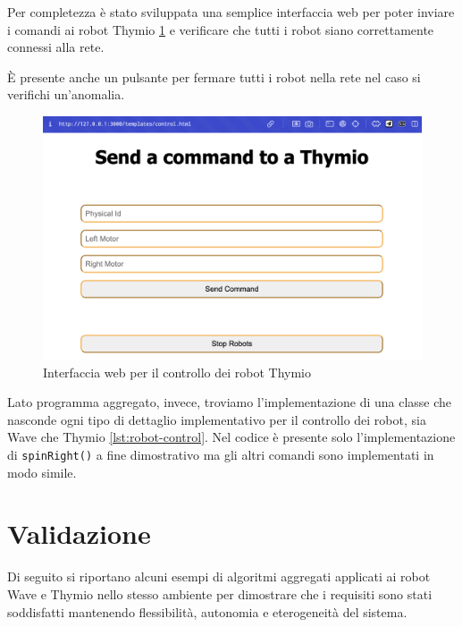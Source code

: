 \documentclass[12pt,a4paper,openright,twoside]{book}
\begin{document}




Per completezza è stato sviluppata una semplice interfaccia web per poter inviare i comandi ai robot Thymio \cref{fig:web-interface} e verificare che tutti i robot siano correttamente connessi alla rete.

È presente anche un pulsante per fermare tutti i robot nella rete nel caso si verifichi un'anomalia.

\begin{figure}
    \centering
    \includegraphics[width=.8\linewidth]{figures/web-interface.png}
    \caption{Interfaccia web per il controllo dei robot Thymio}
    \label{fig:web-interface}
\end{figure}

Lato programma aggregato, invece, troviamo l'implementazione di una classe che nasconde ogni tipo di dettaglio implementativo per il controllo dei robot, sia Wave che Thymio \cref{lst:robot-control}. Nel codice è presente solo l'implementazione di \verb|spinRight()| a fine dimostrativo ma gli altri comandi sono implementati in modo simile.



\chapter{Validazione}
\label{chap:validazione}

Di seguito si riportano alcuni esempi di algoritmi aggregati applicati ai robot Wave e Thymio nello stesso ambiente per dimostrare che i requisiti sono stati soddisfatti mantenendo flessibilità, autonomia e eterogeneità del sistema.
\end{document}
